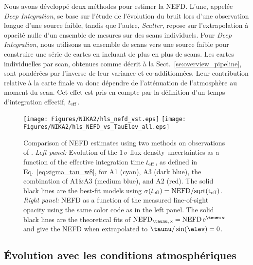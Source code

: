 Nous avons développé deux méthodes pour estimer la NEFD. L'une,
appelée \emph{Deep Integration}, se base sur l'étude de l'évolution du
bruit lors d'une observation longue d'une source faible, tandis que
l'autre, \emph{Scatter}, repose sur l'extrapolation à
opacité nulle d'un ensemble de mesures sur des scans individuels.
Pour \emph{Deep Integration}, nous utilisons un ensemble de scans vers une
source faible pour construire une série de cartes en incluant de
plus en plus de scans. Les cartes individuelles par scan, obtenues
comme décrit à la Sect.~\ref{se:overview_pipeline}, sont pondérées par
l'inverse de leur variance et co-additionnées. Leur contribution
relative à la carte finale va donc dépendre de l'atténuation de
l'atmosphère au moment du scan. Cet effet est pris en compte par la
définition d'un temps d'integration effectif, $t_{\rm{eff}}$. 









\begin{figure}[!thbp]
  \begin{center}
    \texttt{[image: Figures/NIKA2/hls\_nefd\_vst.eps]}
    \texttt{[image: Figures/NIKA2/hls\_NEFD\_vs\_TauElev\_all.eps]}
    \caption{Comparison of NEFD estimates using two methods on observations of
      \hls. \emph{Left panel:} Evolution of the 1\,$\sigma$ flux density
      uncertainties as a function of the effective integration time
      $t_{\rm{eff}}$, as defined in Eq.~\ref{eq:sigma_tau_w8}, for A1
    (cyan), A3 (dark blue), the combination of A1\&A3 (medium blue),
    and A2 (red). The solid black lines are the best-fit models using
    $\sigma(t_{\rm{eff}}) =  \rm{NEFD}/sqrt(t_{\rm{eff}})$. \emph{Right panel:} NEFD as a function of the
    measured line-of-sight opacity using the same color code as in the
    left panel. The solid black lines are the theoretical
    fits of $\rm{NEFD}_{\taunu,\, x } = \rm{NEFD}\, e^{\taunu\,x}$ and give the
    NEFD when extrapolated to $\taunu/\sin(\elev)= 0$. }
    \label{fig:nefd_twomethods}
  \end{center}
\end{figure}

\subsection{\'Evolution avec les conditions atmosphériques}
\label{se:nefd_mesures}
{\color{vert}\lipsum[1-2]}

